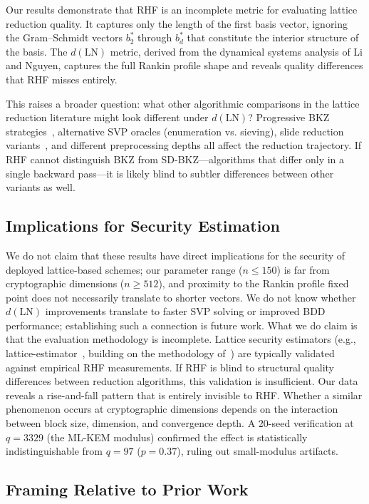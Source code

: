 \documentclass[journal=cic,version=preprint]{iacrj}
\begin{document}
Our results demonstrate that RHF is an incomplete metric for evaluating lattice reduction quality. It captures only the length of the first basis vector, ignoring the Gram--Schmidt vectors $b^*_2$ through $b^*_d$ that constitute the interior structure of the basis. The $d(\mathrm{LN})$ metric, derived from the dynamical systems analysis of Li and Nguyen, captures the full Rankin profile shape and reveals quality differences that RHF misses entirely.

This raises a broader question: what other algorithmic comparisons in the lattice reduction literature might look different under $d(\mathrm{LN})$? Progressive BKZ strategies~\cite{EC:AWHT16}, alternative SVP oracles (enumeration vs. sieving), slide reduction variants~\cite{C:ALNS20}, and different preprocessing depths all affect the reduction trajectory. If RHF cannot distinguish BKZ from SD-BKZ---algorithms that differ only in a single backward pass---it is likely blind to subtler differences between other variants as well.

\subsection{Implications for Security Estimation}

We do not claim that these results have direct implications for the security of deployed lattice-based schemes; our parameter range ($n\leq 150$) is far from cryptographic dimensions ($n\geq 512$), and proximity to the Rankin profile fixed point does not necessarily translate to shorter vectors. We do not know whether $d(\mathrm{LN})$ improvements translate to faster SVP solving or improved BDD performance; establishing such a connection is future work. What we do claim is that the evaluation methodology is incomplete. Lattice security estimators (e.g., lattice-estimator~\cite{LatticeEstimator}, building on the methodology of~\cite{EPRINT:AlbPlaSco15}) are typically validated against empirical RHF measurements. If RHF is blind to structural quality differences between reduction algorithms, this validation is insufficient. Our data reveals a rise-and-fall pattern that is entirely invisible to RHF. Whether a similar phenomenon occurs at cryptographic dimensions depends on the interaction between block size, dimension, and convergence depth. A 20-seed verification at $q=3329$ (the ML-KEM modulus) confirmed the effect is statistically indistinguishable from $q=97$ ($p=0.37$), ruling out small-modulus artifacts.

\subsection{Framing Relative to Prior Work}
\end{document}
